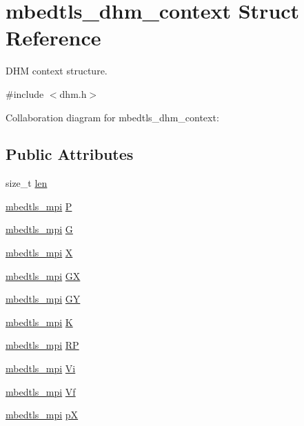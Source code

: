 \hypertarget{structmbedtls__dhm__context}{}\section{mbedtls\+\_\+dhm\+\_\+context Struct Reference}
\label{structmbedtls__dhm__context}


D\+HM context structure.  




{\ttfamily \#include $<$dhm.\+h$>$}



Collaboration diagram for mbedtls\+\_\+dhm\+\_\+context\+:
\subsection*{Public Attributes}
\begin{DoxyCompactItemize}
\item 
size\+\_\+t \mbox{\hyperlink{structmbedtls__dhm__context_aaadf5b8713eeb657004c50742d9e26b1}{len}}
\item 
\mbox{\hyperlink{structmbedtls__mpi}{mbedtls\+\_\+mpi}} \mbox{\hyperlink{structmbedtls__dhm__context_a94404f47038e146712b25d142ea4abd0}{P}}
\item 
\mbox{\hyperlink{structmbedtls__mpi}{mbedtls\+\_\+mpi}} \mbox{\hyperlink{structmbedtls__dhm__context_a4fa0b65bab8ce280ffab2df4285b7ee1}{G}}
\item 
\mbox{\hyperlink{structmbedtls__mpi}{mbedtls\+\_\+mpi}} \mbox{\hyperlink{structmbedtls__dhm__context_a175e534f5a3a4483ebcc4d7ec852d4cd}{X}}
\item 
\mbox{\hyperlink{structmbedtls__mpi}{mbedtls\+\_\+mpi}} \mbox{\hyperlink{structmbedtls__dhm__context_ac33a9d76870e8a807e1d0d9bf77fe85e}{GX}}
\item 
\mbox{\hyperlink{structmbedtls__mpi}{mbedtls\+\_\+mpi}} \mbox{\hyperlink{structmbedtls__dhm__context_a834d14fb13ba02b1d604c306d0792bca}{GY}}
\item 
\mbox{\hyperlink{structmbedtls__mpi}{mbedtls\+\_\+mpi}} \mbox{\hyperlink{structmbedtls__dhm__context_a2226d2a7380caf66c6e962e8d5edbb41}{K}}
\item 
\mbox{\hyperlink{structmbedtls__mpi}{mbedtls\+\_\+mpi}} \mbox{\hyperlink{structmbedtls__dhm__context_ae1801da339af972ee271f947b3fe3734}{RP}}
\item 
\mbox{\hyperlink{structmbedtls__mpi}{mbedtls\+\_\+mpi}} \mbox{\hyperlink{structmbedtls__dhm__context_a21fea3aadf6f05d8aa42c79e55c5d98c}{Vi}}
\item 
\mbox{\hyperlink{structmbedtls__mpi}{mbedtls\+\_\+mpi}} \mbox{\hyperlink{structmbedtls__dhm__context_a1ebf1105240ca26820edb81f41dd6180}{Vf}}
\item 
\mbox{\hyperlink{structmbedtls__mpi}{mbedtls\+\_\+mpi}} \mbox{\hyperlink{structmbedtls__dhm__context_abd0b3459e4a58e2b29b3bd29f6358319}{pX}}
\end{DoxyCompactItemize}



